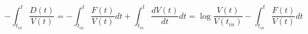 \begin{equation}
-\int_{t_{in}}^t \frac{D(t)}{V(t)}=-\int_{t_{in}}^t \frac{F(t)}{V(t)} dt + \int_{t_{in}}^t \frac{dV(t)}{dt} dt = \log \frac{V(t)}{V(t_{in})}- \int_{t_{in}}^t \frac{F(t)}{V(t)} dt
\end{equation}